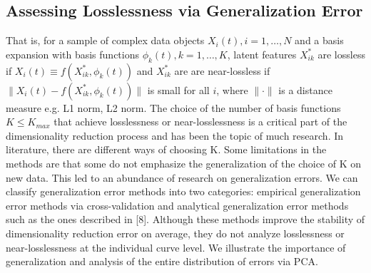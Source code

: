 \subsection{Assessing Losslessness via Generalization Error}


{\color{red}
That is, for a sample of complex data objects $X_i(t), i = 1, \dots ,N$ and a basis expansion with basis functions $\phi_k(t), k = 1, \dots, K$, latent features $X_{ik}^*$ are lossless if $X_i(t)  \equiv f(X_{ik}^*, \phi_k(t))$ and $X_{ik}^*$ are are near-lossless if $\lVert  X_i(t) - f(X_{ik}^*, \phi_k(t)) \rVert$ is small for all $i$, where $\lVert \cdot \rVert$ is a distance measure e.g. L1 norm, L2 norm. The choice of the number of basis functions $K \leq K_{max}$ that achieve losslessness or near-losslessness is a critical part of the dimensionality reduction process and has been the topic of much research. In literature, there are different ways of choosing K. Some limitations in the methods are that some do not emphasize the generalization of the choice of K on new data. This led to an abundance of research on generalization errors. We can classify generalization error methods into two categories: empirical generalization error methods via cross-validation and analytical generalization error methods such as the ones described in [8]. Although these methods improve the stability of dimensionality reduction error on average, they do not analyze losslessness or near-losslessness at the individual curve level. We illustrate the importance of generalization and analysis of the entire distribution of errors via PCA.
}

